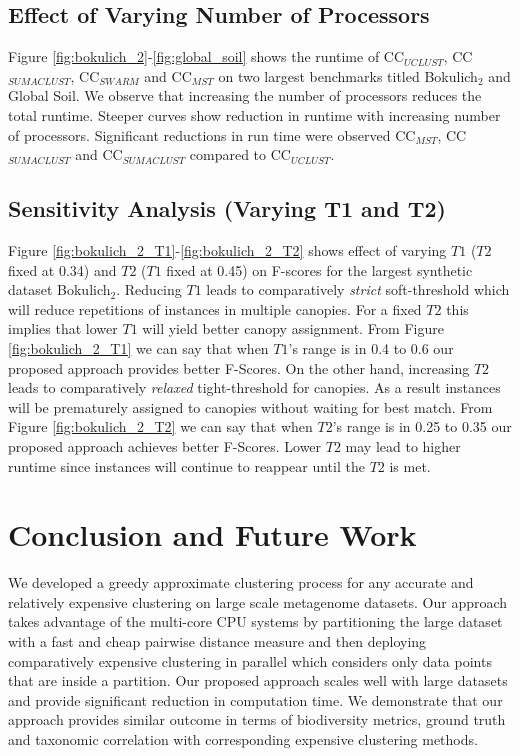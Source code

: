 \documentclass[10pt, conference, compsocconf]{IEEEtran}
\begin{document}
\subsection{\textbf{Effect of Varying Number of Processors}}
Figure \ref{fig:bokulich_2}-\ref{fig:global_soil} shows the runtime of CC$_{UCLUST}$, CC$_{SUMACLUST}$, CC$_{SWARM}$ and CC$_{MST}$ on two largest benchmarks titled Bokulich$_2$ and Global Soil. We observe that increasing the number of processors reduces the total runtime. Steeper curves show reduction in runtime with increasing number of processors. Significant reductions in run time were observed CC$_{MST}$, CC$_{SUMACLUST}$ and CC$_{SUMACLUST}$ compared to CC$_{UCLUST}$.   

\subsection{\textbf{Sensitivity Analysis (Varying T1 and T2)}}
Figure \ref{fig:bokulich_2_T1}-\ref{fig:bokulich_2_T2} shows effect of varying $T1$ ($T2$ fixed at 0.34) and $T2$ ($T1$ fixed at 0.45) on F-scores for the largest synthetic dataset Bokulich$_2$. Reducing $T1$ leads to comparatively \textit{strict} soft-threshold which will reduce repetitions of instances in multiple canopies. For a fixed $T2$ this implies that lower $T1$ will yield better canopy assignment. From Figure \ref{fig:bokulich_2_T1} we can say that when $T1$'s range is in 0.4 to 0.6 our proposed approach provides better F-Scores. On the other hand, increasing $T2$ leads to comparatively \textit{relaxed} tight-threshold for canopies. As a result instances will be prematurely assigned to canopies without waiting for best match. From Figure \ref{fig:bokulich_2_T2} we can say that when $T2$'s range  is in 0.25 to 0.35 our proposed approach achieves better F-Scores. Lower $T2$ may lead to higher runtime since instances will continue to reappear until the $T2$ is met.                   


\section{Conclusion and Future Work}
\label{sec:Conclusion}

We developed a greedy approximate clustering process for any accurate and relatively expensive clustering on large scale metagenome datasets. Our approach takes advantage of the multi-core CPU systems by partitioning the large dataset with a fast and cheap pairwise distance measure and then deploying comparatively expensive clustering in parallel which considers only data points that are inside a partition. Our proposed approach scales well with large datasets and provide significant reduction in computation time. We demonstrate that our approach provides similar outcome in terms of biodiversity metrics, ground truth and taxonomic correlation with corresponding expensive clustering methods.





\end{document}
